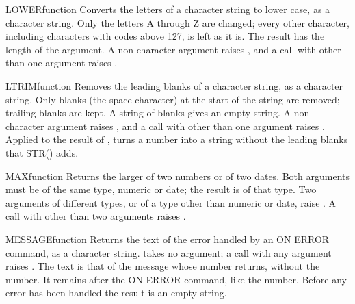 \begin{XbaseEntry}{LOWER}{function}
Converts the letters of a character string to lower case, as a character string.
\Syntax
{}
\Usage
Only the letters A through Z are changed; every other character, including characters with codes above 127, is left as it is. The result has the length of the argument. A non-character argument raises , and a call with other than one argument raises .
\Examples
{}
\end{XbaseEntry}

\begin{XbaseEntry}{LTRIM}{function}
Removes the leading blanks of a character string, as a character string.
\Syntax
{}
\Usage
Only blanks (the space character) at the start of the string are removed; trailing blanks are kept. A string of blanks gives an empty string. A non-character argument raises , and a call with other than one argument raises .
\Tips
Applied to the result of ,  turns a number into a string without the leading blanks that STR() adds.
\Examples
{}
\end{XbaseEntry}

\begin{XbaseEntry}{MAX}{function}
Returns the larger of two numbers or of two dates.
\Syntax
{}
\Usage
Both arguments must be of the same type, numeric or date; the result is of that type. Two arguments of different types, or of a type other than numeric or date, raise . A call with other than two arguments raises .
\Examples
{}
\end{XbaseEntry}

\begin{XbaseEntry}{MESSAGE}{function}
Returns the text of the error handled by an ON ERROR command, as a character string.
\Syntax
{}
\Usage
{} takes no argument; a call with any argument raises . The text is that of the message whose number  returns, without the number. It remains after the ON ERROR command, like the number. Before any error has been handled the result is an empty string.
\Examples
{}
\end{XbaseEntry}

